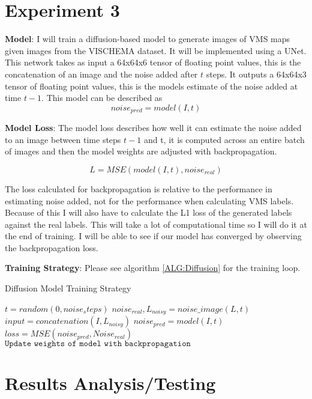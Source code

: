 \documentclass{UoYCSproject}
\begin{document}
\section{Experiment 3}
%
\textbf{Model}: I will train a diffusion-based model to generate images of VMS maps given images from the VISCHEMA dataset. It will be implemented using a UNet. This network takes as input a 64x64x6 tensor of floating point values, this is the concatenation of an image and the noise added after $t$ steps.
It outputs a 64x64x3 tensor of floating point values, this is the models estimate of the noise added at time $t-1$.
This model can be described as \[ noise_{pred} = model(I, t) \]

\textbf{Model Loss}: The model loss describes how well it can estimate the noise added to an image between time steps $t-1$ and t, it is computed across an entire batch of images and then the model weights are adjusted with backpropagation.

\[ L = MSE( model(I, t), noise_{real} ) \]

The loss calculated for backpropagation is relative to the performance in estimating noise added, not for the performance when calculating VMS labels. Because of this I will also have to calculate the L1 loss of the generated labels against the real labels. This will take a lot of computational time so I will do it at the end of training. I will be able to see if our model has converged by observing the backpropagation loss. 

\textbf{Training Strategy}: Please see algorithm \ref{ALG:Diffusion} for the training loop.

\begin{algorithm}
\caption{Diffusion Model Training Strategy}\label{ALG:Diffusion}
\begin{algorithmic}[1]
\State
\State $t = random(0, noise_steps)$
\State $noise_{real}, L_{noisy} = noise\_image(L, t)$ 
\State
\State $input = concatenation(I, L_{noisy})$
\State $noise_{pred} = model(I, t)$
\State $loss = MSE( noise_{pred}, Noise_{real} )$
\State $\texttt{Update weights of model with backpropagation}$
\EndFor
\EndFor
\end{algorithmic}
\end{algorithm}

\section{Results Analysis/Testing}
\end{document}
